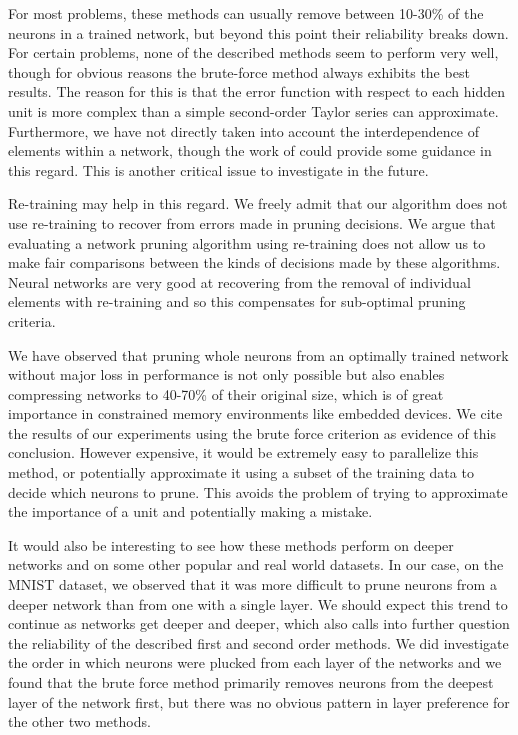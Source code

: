 For most problems, these methods can usually remove between 10-30\% of the neurons in a trained network, but beyond this point their reliability breaks down. For certain problems, none of the described methods seem to perform very well, though for obvious reasons the brute-force method always exhibits the best results. The reason for this is that the error function with respect to each hidden unit is more complex than a simple second-order Taylor series can approximate. Furthermore, we have not directly taken into account the interdependence of elements within a network, though the work of \cite{hassibi1993second} could provide some guidance in this regard. This is another critical issue to investigate in the future. 

Re-training may help in this regard. We freely admit that our algorithm does not use re-training to recover from errors made in pruning decisions. We argue that evaluating a network pruning algorithm using re-training does not allow us to make fair comparisons between the kinds of decisions made by these algorithms. Neural networks are very good at recovering from the removal of individual elements with re-training and so this compensates for sub-optimal pruning criteria. 

We have observed that pruning whole neurons from an optimally trained network without major loss in performance is not only possible but also enables compressing networks to 40-70\% of their original size, which is of great importance in constrained memory environments like embedded devices. We cite the results of our experiments using the brute force criterion as evidence of this conclusion. However expensive, it would be extremely easy to parallelize this method, or potentially approximate it using a subset of the training data to decide which neurons to prune. This avoids the problem of trying to approximate the importance of a unit and potentially making a mistake. 

It would also be interesting to see how these methods perform on deeper networks and on some other popular and real world datasets. In our case, on the MNIST dataset, we observed that it was more difficult to prune neurons from a deeper network than from one with a single layer. We should expect this trend to continue as networks get deeper and deeper, which also calls into further question the reliability of the described first and second order methods. We did investigate the order in which neurons were plucked from each layer of the networks and we found that the brute force method primarily removes neurons from the deepest layer of the network first, but there was no obvious pattern in layer preference for the other two methods. 

